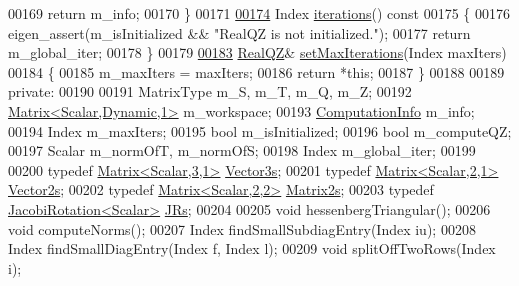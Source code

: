 \begin{DoxyCode}
00169         \textcolor{keywordflow}{return} m\_info;
00170       \}
00171 
\hyperlink{group___eigenvalues___module_afbecc6d0ab1de42be9db79428da48ab6}{00174}       Index \hyperlink{group___eigenvalues___module_afbecc6d0ab1de42be9db79428da48ab6}{iterations}()\textcolor{keyword}{ const}
00175 \textcolor{keyword}{      }\{
00176         eigen\_assert(m\_isInitialized && \textcolor{stringliteral}{"RealQZ is not initialized."});
00177         \textcolor{keywordflow}{return} m\_global\_iter;
00178       \}
00179 
\hyperlink{group___eigenvalues___module_a30ae65666b1757e4a2b6a28eaec12226}{00183}       \hyperlink{group___eigenvalues___module_class_eigen_1_1_real_q_z}{RealQZ}& \hyperlink{group___eigenvalues___module_a30ae65666b1757e4a2b6a28eaec12226}{setMaxIterations}(Index maxIters)
00184       \{
00185         m\_maxIters = maxIters;
00186         \textcolor{keywordflow}{return} *\textcolor{keyword}{this};
00187       \}
00188 
00189     \textcolor{keyword}{private}:
00190 
00191       MatrixType m\_S, m\_T, m\_Q, m\_Z;
00192       \hyperlink{group___core___module}{Matrix<Scalar,Dynamic,1>} m\_workspace;
00193       \hyperlink{group__enums_ga85fad7b87587764e5cf6b513a9e0ee5e}{ComputationInfo} m\_info;
00194       Index m\_maxIters;
00195       \textcolor{keywordtype}{bool} m\_isInitialized;
00196       \textcolor{keywordtype}{bool} m\_computeQZ;
00197       Scalar m\_normOfT, m\_normOfS;
00198       Index m\_global\_iter;
00199 
00200       \textcolor{keyword}{typedef} \hyperlink{group___core___module}{Matrix<Scalar,3,1>} \hyperlink{group___core___module}{Vector3s};
00201       \textcolor{keyword}{typedef} \hyperlink{group___core___module_class_eigen_1_1_matrix}{Matrix<Scalar,2,1>} \hyperlink{group___core___module_class_eigen_1_1_matrix}{Vector2s};
00202       \textcolor{keyword}{typedef} \hyperlink{group___core___module_class_eigen_1_1_matrix}{Matrix<Scalar,2,2>} \hyperlink{group___core___module_class_eigen_1_1_matrix}{Matrix2s};
00203       \textcolor{keyword}{typedef} \hyperlink{group___jacobi___module_class_eigen_1_1_jacobi_rotation}{JacobiRotation<Scalar>} \hyperlink{group___jacobi___module_class_eigen_1_1_jacobi_rotation}{JRs};
00204 
00205       \textcolor{keywordtype}{void} hessenbergTriangular();
00206       \textcolor{keywordtype}{void} computeNorms();
00207       Index findSmallSubdiagEntry(Index iu);
00208       Index findSmallDiagEntry(Index f, Index l);
00209       \textcolor{keywordtype}{void} splitOffTwoRows(Index i);

\end{DoxyCode}
